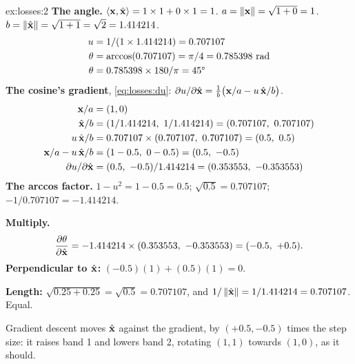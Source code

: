 \begin{solution}{ex:losses:2}
\textbf{The angle.} $\left\langle \mathbf{x}, \hat{\mathbf{x}} \right\rangle = 1 \times 1 + 0 \times 1 = 1$. $a = \left\lVert \mathbf{x} \right\rVert =
\sqrt{1 + 0} = 1$. $b = \left\lVert \hat{\mathbf{x}} \right\rVert = \sqrt{1 + 1} = \sqrt{2} = 1.414214$.
\begin{align*}
u &= 1/(1 \times 1.414214) = 0.707107\\
\theta &= \arccos(0.707107) = \pi/4 = 0.785398 \text{ rad}\\
\theta &= 0.785398 \times 180/\pi = 45\text{\textdegree}
\end{align*}
\textbf{The cosine's gradient}, \cref{eq:losses:du}: $\partial u/\partial\hat{\mathbf{x}} = \frac{1}{b}\big(\mathbf{x}/a - u\,\hat{\mathbf{x}}/b\big)$.
\begin{align*}
\vect{x}/a &= (1, 0)\\
\xhat/b &= (1/1.414214,\ 1/1.414214) = (0.707107,\ 0.707107)\\
u\,\xhat/b &= 0.707107 \times (0.707107,\ 0.707107) = (0.5,\ 0.5)\\
\vect{x}/a - u\,\xhat/b &= (1 - 0.5,\ 0 - 0.5) = (0.5,\ -0.5)\\
\partial u/\partial\xhat &= (0.5,\ -0.5)/1.414214 = (0.353553,\ -0.353553)
\end{align*}
\textbf{The arccos factor.} $1 - u^2 = 1 - 0.5 = 0.5$; $\sqrt{0.5} = 0.707107$; $-1/0.707107 =
-1.414214$.

\textbf{Multiply.}
\[
\frac{\partial\theta}{\partial\hat{\mathbf{x}}} = -1.414214 \times (0.353553,\ -0.353553) = (-0.5,\ +0.5).
\]
\textbf{Perpendicular to $\hat{\mathbf{x}}$:} $(-0.5)(1) + (0.5)(1) = 0$.

\textbf{Length:} $\sqrt{0.25 + 0.25} = \sqrt{0.5} = 0.707107$, and $1/\left\lVert \hat{\mathbf{x}} \right\rVert = 1/1.414214
= 0.707107$. Equal.

Gradient descent moves $\hat{\mathbf{x}}$ against the gradient, by $(+0.5, -0.5)$ times the step size:
it raises band 1 and lowers band 2, rotating $(1, 1)$ towards $(1, 0)$, as it should.
\end{solution}

